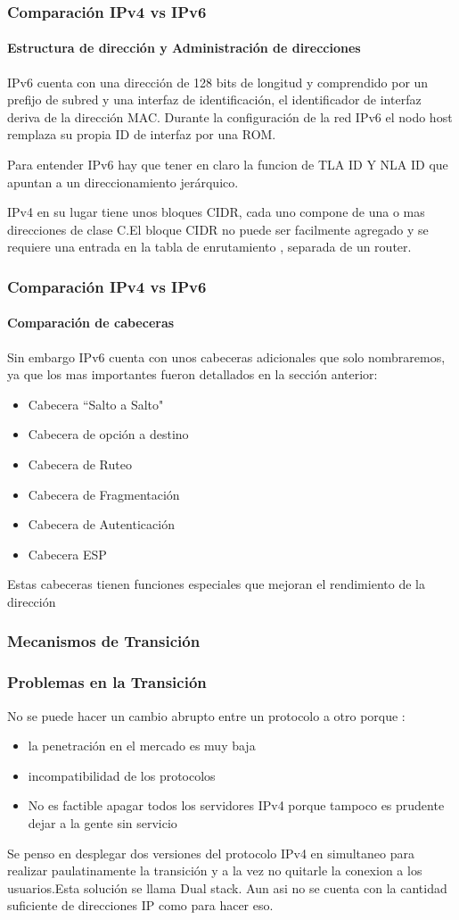 \documentclass{beamer}
\begin{document}
\begin{frame}
\frametitle{Comparación IPv4 vs IPv6}
\framesubtitle{Estructura de dirección y Administración de direcciones}
IPv6 cuenta con una dirección de 128 bits de longitud y comprendido por un prefijo de subred y una 
interfaz de identificación, el identificador de interfaz deriva de la 
dirección MAC. Durante la configuración de la red IPv6 el nodo host remplaza su propia ID de 
interfaz por una ROM.
\par Para entender IPv6 hay que tener en claro la funcion de TLA ID Y NLA ID que apuntan a un direccionamiento jerárquico.
\par IPv4 en su lugar tiene unos bloques CIDR, cada uno compone de una o mas direcciones de clase C.El bloque CIDR no puede ser facilmente agregado y se requiere una entrada en la tabla de enrutamiento , separada de un router.
\end{frame}


\begin{frame}
\frametitle{Comparación IPv4 vs IPv6}
\framesubtitle{Comparación de cabeceras}
Sin embargo IPv6 cuenta con unos cabeceras adicionales que solo nombraremos, ya que los mas 
importantes fueron detallados en la sección anterior:
\begin{itemize}
\item Cabecera ``Salto a Salto" 
\item Cabecera de opción a destino
\item  Cabecera  de Ruteo
\item Cabecera de Fragmentación
\item Cabecera de Autenticación
\item  Cabecera ESP
\end{itemize}
Estas cabeceras tienen funciones especiales que mejoran el rendimiento de la dirección
\end{frame}




\begin{frame}
\frametitle{Mecanismos de Transición}
\frametitle{Problemas en la Transición}
No se puede hacer un cambio abrupto entre un protocolo a otro porque : 
\begin{itemize}
\item la penetración en el mercado es muy baja 
\item incompatibilidad de los protocolos
\item  No es factible apagar todos los servidores IPv4 porque tampoco es prudente dejar a la gente sin servicio

\end{itemize}
Se penso en desplegar dos versiones del protocolo IPv4 en simultaneo para realizar paulatinamente la transición y a la vez  no quitarle la conexion a los usuarios.Esta solución se llama Dual stack.
Aun asi no se cuenta con la cantidad suficiente de direcciones IP como para hacer eso.
\end{frame}
\end{document}
